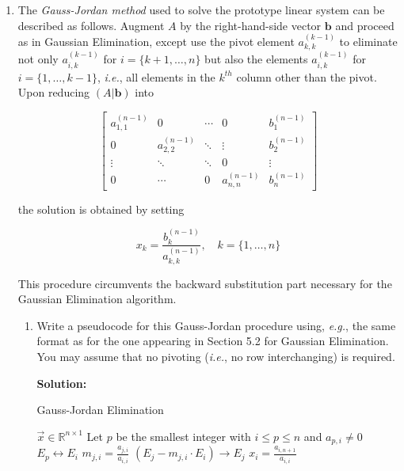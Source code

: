 \documentclass[12pt]{article}
\begin{document}
\begin{enumerate}
\item The {\em Gauss-Jordan method} used to solve the prototype linear system can be described
as follows. Augment $A$ by the right-hand-side vector $\mathbf{b}$ and proceed as in Gaussian Elimination,
except use the pivot element $a_{k,k}^{(k-1)}$ to eliminate not only $a_{i,k}^{(k-1)}$ for $i = \{ k+1, \ldots, n\}$
but also the elements $a_{i,k}^{(k-1)}$ for $i = \{1, \ldots, k-1\}$, {\em i.e.}, all elements in the $k^{th}$ column
other than the pivot. Upon reducing $(A|\mathbf{b})$ into

\[
\left[
\begin{array}{cccc|c}
  a_{1,1}^{(n-1)} & 0 & \cdots & 0 & b_{1}^{(n-1)}\\
  0 & a_{2,2}^{(n-1)} & \ddots & \vdots & b_{2}^{(n-1)}\\
  \vdots & \ddots & \ddots & 0 & \vdots\\
  0 & \cdots & 0 & a_{n,n}^{(n-1)} & b_{n}^{(n-1)}
\end{array}\right]
\]

the solution is obtained by setting

\[
x_{k} = \frac{b_{k}^{(n-1)}}{a_{k,k}^{(n-1)}},\quad k = \{ 1, \ldots, n\}
\]

This procedure circumvents the backward substitution part necessary for the Gaussian Elimination algorithm.

\begin{enumerate}
\item Write a pseudocode for this Gauss-Jordan procedure using, {\em e.g.}, the same format
as for the one appearing in Section 5.2 for Gaussian Elimination. You may assume that no
pivoting ({\em i.e.}, no row interchanging) is required.

{\bf Solution:}

\begin{algorithm}[H]
\caption{Gauss-Jordan Elimination}
\begin{algorithmic}[1]
\ENSURE $\vec{x}\in \mathbb{R}^{n\times 1}$
    \STATE Let $p$ be the smallest integer with $i \leq p \leq n$ and $a_{p,i}\neq 0$
    \ENDIF
        \STATE $E_{p} \leftrightarrow E_{i}$
    \ENDIF
      \STATE $m_{j,i} = \frac{a_{j,i}}{a_{i,i}}$
      \STATE $(E_{j} - m_{j,i}\cdot E_{i}) \rightarrow E_{j}$
    \ENDFOR
\ENDFOR
{}
    \STATE $x_{i} = \frac{a_{i,n+1}}{a_{i,i}}$
\ENDFOR
{}
\end{algorithmic}
\end{algorithm}


\end{enumerate}
\end{enumerate}
\end{document}
